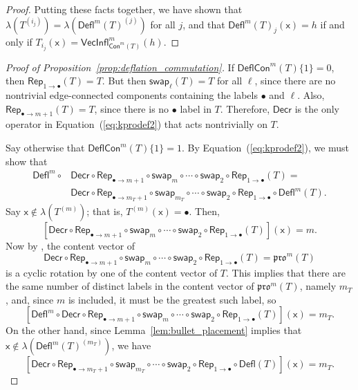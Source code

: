 \documentclass[12pt]{amsart}
\newcommand{\x}{\ensuremath{\mathsf{x}}}
\theoremstyle{definition}
\theoremstyle{remark}
\numberwithin{equation}{section}
\newcommand{\pro}{\mathfrak{pro}}
\newcommand{\swap}{\ensuremath{\mathsf{swap}}}
\newcommand{\decr}{\ensuremath{\mathsf{Decr}}}
\newcommand{\rep}{\ensuremath{\mathsf{Rep}}}
\newcommand{\deflate}{\ensuremath{\mathsf{Defl}}}
\newcommand{\inflate}{\ensuremath{\mathsf{VecInfl}}}
\newcommand{\content}{\ensuremath{\mathsf{Con}}}
\newcommand{\compress}{\ensuremath{\mathsf{DeflCon}}}
\begin{document}
\begin{proof}
Putting these facts together, we have shown that $\lambda \left(T^{(i_j)} \right) = \lambda \left(\deflate^m(T)^{(j)} \right)$ for all $j$, and that $\deflate^m(T)_j(\x) = h$ if and only if $T_{i_j}(\x) = \inflate^m_{\content^m(T)}(h)$. 
\end{proof}

\begin{proof}[Proof of Proposition~\ref{prop:deflation_commutation}]
If $\compress^m(T)\lbrace 1 \rbrace = 0$, then $\rep_{1 \rightarrow \bullet}(T) = T$. But then $\swap_\ell(T) = T$ for all $\ell$, since there are no nontrivial edge-connected components containing the labels $\bullet$ and $\ell$. Also, $\rep_{\bullet \rightarrow m+1}(T) = T$, since there is no $\bullet$ label in $T$. Therefore, $\decr$ is the only operator in Equation~(\ref{eq:kprodef2}) that acts nontrivially on $T$. 


Say otherwise that $\compress^m(T)\lbrace 1 \rbrace = 1$. By Equation~(\ref{eq:kprodef2}), we must show that
\begin{align*}
\deflate^m \circ &\decr \circ \rep_{\bullet \rightarrow m+1} \circ \swap_m \circ \cdots \circ \swap_2\circ \rep_{1 \rightarrow \bullet} (T) = \\
 & \decr \circ \rep_{\bullet \rightarrow m_T+1} \circ \swap_{m_T} \circ \cdots \circ \swap_2 \circ \rep_{1 \rightarrow \bullet} \circ \deflate^m (T). 
\end{align*}
Say $\x \not \in \lambda(T^{(m)})$; that is,  $T^{(m)}(\x) = \bullet$.  Then,
\[
[\decr \circ \rep_{\bullet \rightarrow m+1} \circ \swap_m \circ \cdots \circ \swap_2 \circ \rep_{1 \rightarrow \bullet} (T)](\x) = m.
\]
Now by \cite[Lemma~2.1]{DPS}, the content vector of  
\[
\decr \circ \rep_{\bullet \rightarrow m+1} \circ \swap_m \circ \cdots \circ \swap_2 \circ \rep_{1 \rightarrow \bullet} (T) = \pro^m(T)
\]
 is a cyclic rotation by one of the content vector of $T$. This implies that there are the same number of distinct labels in the content vector of $\pro^m(T)$, namely $m_T$, and, since $m$ is included, it must be the greatest such label, so 
 \[
 [\deflate^m \circ \decr \circ \rep_{\bullet \rightarrow m+1} \circ \swap_m \circ \cdots \circ \swap_2 \circ \rep_{1 \rightarrow \bullet} (T)](\x) = m_T.
 \]
  On the other hand, since Lemma~\ref{lem:bullet_placement} implies that $\x \not \in \lambda(\deflate^m(T)^{(m_T)})$, we have
  \[
  [\decr \circ \rep_{\bullet \rightarrow m_T + 1} \circ \swap_{m_T} \circ \cdots \circ \swap_2 \circ \rep_{1 \rightarrow \bullet} \circ \deflate(T)](\x) = m_T.
  \] 


\end{proof}
\end{document}
